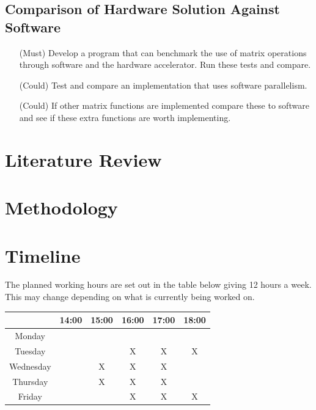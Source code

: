 \documentclass[a4paper,fleqn,12pt]{article}
\begin{document}
	\subsection{Comparison of Hardware Solution Against Software}
	\begin{enumerate}
		\item [(Must)] Develop a program that can benchmark the use of matrix operations through software and the hardware accelerator. Run these tests and compare.
		\item [(Could)] Test and compare an implementation that uses software parallelism.
		\item [(Could)] If other matrix functions are implemented compare these to software and see if these extra functions are worth implementing.
	\end{enumerate}

	\section{Literature Review}
			
	\section{Methodology}
	
	\section{Timeline}
	The planned working hours are set out in the table below giving 12 hours a week. This may change depending on what is currently being worked on.
	
	\begin{table}[h]
		\centering
		\begin{tabular}{c|c|c|c|c|c|}
			\cline{2-6}
			& 14:00 & 15:00 & 16:00 & 17:00 & 18:00 \\ \hline
			\multicolumn{1}{|c|}{Monday}    &       &       &       &       &       \\ \hline
			\multicolumn{1}{|c|}{Tuesday}   &       &       & X     & X     & X     \\ \hline
			\multicolumn{1}{|c|}{Wednesday} &       & X     & X     & X     &       \\ \hline
			\multicolumn{1}{|c|}{Thursday}  &       & X     & X     & X     &       \\ \hline
			\multicolumn{1}{|c|}{Friday}    &       &       & X     & X     & X     \\ \hline
		\end{tabular}
	\end{table}
\end{document}
